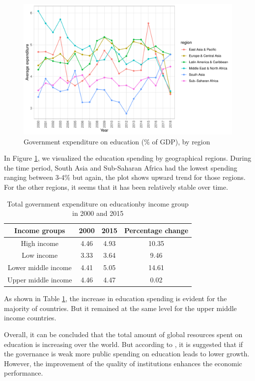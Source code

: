 \documentclass[11pt,a4paper,]{article}
\begin{document}
\begin{figure}
\centering
\includegraphics{report_files/figure-latex/plot3-zb-1.pdf}
\caption{\label{fig:plot3-zb}Government expenditure on education (\% of GDP), by region}
\end{figure}

In Figure \ref{fig:plot3-zb}, we visualized the education spending by geographical regions. During the time period, South Asia and Sub-Saharan Africa had the lowest spending ranging between 3-4\% but again, the plot shows upward trend for those regions. For the other regions, it seems that it has been relatively stable over time.

\begin{table}[H]

\caption{\label{tab:plot4-zb}Total government expenditure on educationby income group in 2000 and 2015}
\centering
\begin{tabular}[t]{c|c|c|c}
\hline
Income groups & 2000 & 2015 & Percentage change\\
\hline
High income & 4.46 & 4.93 & 10.35\\
\hline
Low income & 3.33 & 3.64 & 9.46\\
\hline
Lower middle income & 4.41 & 5.05 & 14.61\\
\hline
Upper middle income & 4.46 & 4.47 & 0.02\\
\hline
\end{tabular}
\end{table}

As shown in Table \ref{tab:plot4-zb}, the increase in education spending is evident for the majority of countries. But it remained at the same level for the upper middle income countries.

Overall, it can be concluded that the total amount of global resources spent on education is increasing over the world. But according to \textcite{trabelsi2018public}, it is suggested that if the governance is weak more public spending on education leads to lower growth. However, the improvement of the quality of institutions enhances the economic performance.
\clearpage
\end{document}
